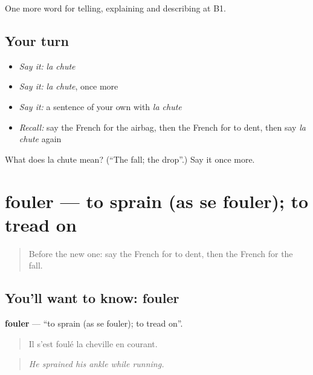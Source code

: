 \begin{grammarlens}[title={What you've built}]
One more word for telling, explaining and describing at B1.
\end{grammarlens}

\subsection*{Your turn}
\begin{itemize}
\raggedright
  \item \emph{Say it:} \emph{la chute}
  \item \emph{Say it:} \emph{la chute}, once more
  \item \emph{Say it:} a sentence of your own with \emph{la chute}
  \item \emph{Recall:} say the French for the airbag, then the French for to dent, then say \emph{la chute} again
\end{itemize}

\begin{tcolorbox}[breakable,colback=teal!4,colframe=teal!35!black,title={Before you move on}]
What does la chute mean? (\textquotedblleft{}The fall; the drop\textquotedblright{}.) Say it once more.
\end{tcolorbox}
\section[fouler]{fouler — to sprain (as se fouler); to tread on}

\label{lesson:FR-C299-fouler}



\begin{quote}
Before the new one: say the French for to dent, then the French for the fall.
\end{quote}

\subsection*{You'll want to know: fouler}
\textbf{fouler} — \textquotedblleft{}to sprain (as se fouler); to tread on\textquotedblright{}.

\begin{quote}
Il s'est foulé la cheville en courant.
\end{quote}

\begin{quote}
\emph{He sprained his ankle while running.}
\end{quote}


